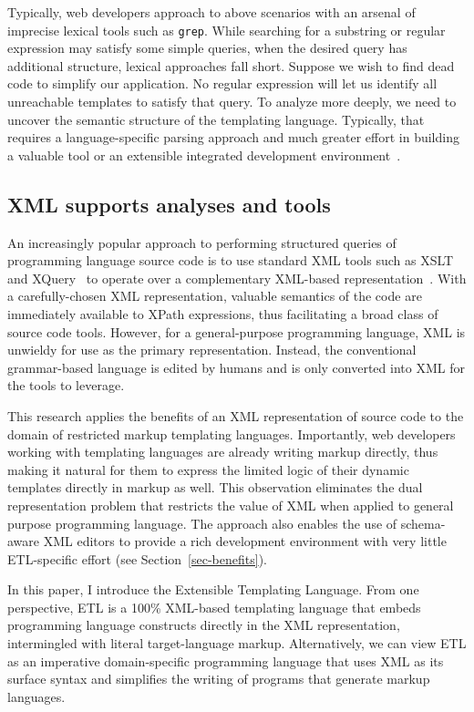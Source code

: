 \documentclass{www2003-submission}
\newcommand{\smtexttt}[1]{{\small\texttt{#1}}}
\newcommand{\secref}[1]{Section~\ref{sec-#1}}
\begin{document}
Typically, web developers approach to above scenarios with an arsenal
of imprecise lexical tools such as \smtexttt{grep}.  While searching
for a substring or regular expression may satisfy some simple queries,
when the desired query has additional structure, lexical approaches
fall short.  Suppose we wish to find dead code to simplify our
application. No regular expression will let us identify all
unreachable templates to satisfy that query.  To analyze more deeply,
we need to uncover the semantic structure of the templating language.
Typically, that requires a language-specific parsing approach and much
greater effort in building a valuable tool or an extensible integrated
development environment~\cite{Soroker97,Eclipse}.

\subsection{XML supports analyses and tools}

An increasingly popular approach to performing structured queries of
programming language source code is to use standard XML tools such as
XSLT~\cite{XSLT} and XQuery~\cite{XQuery} to operate over a
complementary XML-based representation~\cite{Badros-www9,others}.
With a carefully-chosen XML representation, valuable semantics of the
code are immediately available to XPath expressions, thus facilitating
a broad class of source code tools.  However, for a general-purpose
programming language, XML is unwieldy for use as the primary
representation.  Instead, the conventional grammar-based language is
edited by humans and is only converted into XML for the tools to
leverage.

This research applies the benefits of an XML representation of source
code to the domain of restricted markup templating languages.
Importantly, web developers working with templating languages are
already writing markup directly, thus making it natural for them to
express the limited logic of their dynamic templates directly in
markup as well.  This observation eliminates the dual representation
problem that restricts the value of XML when applied to general
purpose programming language.  The approach also enables the use of
schema-aware XML editors to provide a rich development environment
with very little ETL-specific effort (see \secref{benefits}).

In this paper, I introduce the Extensible Templating Language.  From
one perspective, ETL is a 100\% XML-based templating language that
embeds programming language constructs directly in the XML
representation, intermingled with literal target-language markup.
Alternatively, we can view ETL as an imperative domain-specific
programming language that uses XML as its surface syntax and
simplifies the writing of programs that generate markup languages.
\end{document}
